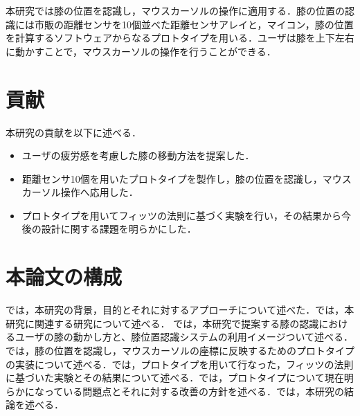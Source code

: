 本研究では膝の位置を認識し，マウスカーソルの操作に適用する．膝の位置の認識には市販の距離センサを10個並べた距離センサアレイと，マイコン，膝の位置を計算するソフトウェアからなるプロトタイプを用いる．ユーザは膝を上下左右に動かすことで，マウスカーソルの操作を行うことができる．

\section{貢献}
本研究の貢献を以下に述べる．
\begin{itemize}
	\item ユーザの疲労感を考慮した膝の移動方法を提案した．
	\item 距離センサ10個を用いたプロトタイプを製作し，膝の位置を認識し，マウスカーソル操作へ応用した．
	\item プロトタイプを用いてフィッツの法則に基づく実験を行い，その結果から今後の設計に関する課題を明らかにした．
\end{itemize}
\section{本論文の構成}
では，本研究の背景，目的とそれに対するアプローチについて述べた．では，本研究に関連する研究について述べる．
では，本研究で提案する膝の認識におけるユーザの膝の動かし方と、膝位置認識システムの利用イメージついて述べる．では，膝の位置を認識し，マウスカーソルの座標に反映するためのプロトタイプの実装について述べる．では，プロトタイプを用いて行なった，フィッツの法則に基づいた実験とその結果について述べる．では，プロトタイプについて現在明らかになっている問題点とそれに対する改善の方針を述べる．では，本研究の結論を述べる．

\begin{comment}
	\fixme{
	\begin{itemize}
		\item 本研究では膝によるマウスカーソル操作を調査する？
		\item 足を使ってみたい
		\item 足先の研究しかない，膝と組み合わせることで様々なインタラクションが可能になる
		\item 膝使ったものは少なく問題がある
		\item 膝を使ったことの理由→足の既存手法と組み合わせることができる，膝の可動域が広い（が先行研究が少ない
		\item いずれにせよ，関連研究が終わるまでに「膝によるマウスカーソル操作」という話に落とし込む
	\end{itemize}
}
\end{comment}
